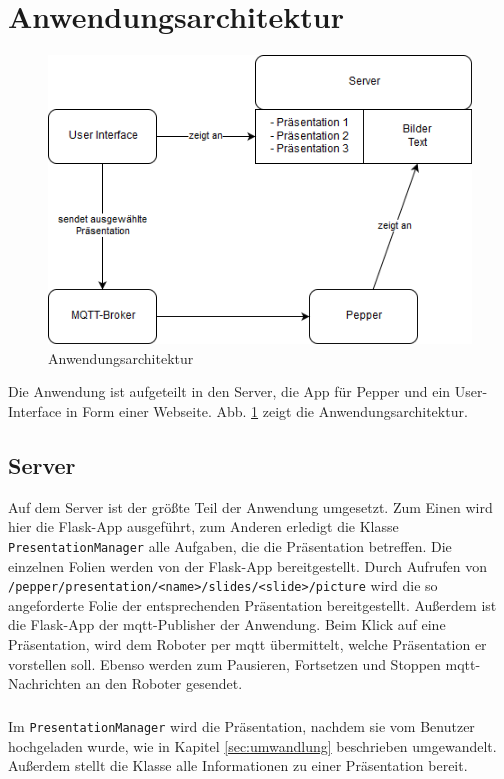 \section{Anwendungsarchitektur}
\begin{figure}
  \centering  
     \includegraphics[width=\textwidth]{anwendungsarchitektur}
  \caption{Anwendungsarchitektur}
  \label{fig:anwendungsarchitektur}
\end{figure}
Die Anwendung ist aufgeteilt in den Server, die App für Pepper und ein
User-Interface in Form einer Webseite. Abb. \ref{fig:anwendungsarchitektur}
zeigt die Anwendungsarchitektur.

\subsection{Server}
Auf dem Server ist der größte Teil der Anwendung umgesetzt. Zum Einen wird hier
die Flask-App ausgeführt, zum Anderen erledigt die Klasse
\texttt{PresentationManager} alle Aufgaben, die die Präsentation betreffen. Die
einzelnen Folien werden von der Flask-App bereitgestellt. Durch Aufrufen von
\texttt{/pepper/presentation/<name>/slides/<slide>/picture} wird die so
angeforderte Folie der entsprechenden Präsentation bereitgestellt. Außerdem ist
die Flask-App der \ac{mqtt}-Publisher der Anwendung. Beim Klick auf eine
Präsentation, wird dem Roboter per \ac{mqtt} übermittelt, welche Präsentation er
vorstellen soll. Ebenso werden zum Pausieren, Fortsetzen und Stoppen
\ac{mqtt}-Nachrichten an den Roboter gesendet.

\subparagraph{}
Im \texttt{PresentationManager} wird die Präsentation, nachdem sie vom Benutzer
hochgeladen wurde, wie in Kapitel \ref{sec:umwandlung} beschrieben umgewandelt.
Außerdem stellt die Klasse alle Informationen zu einer Präsentation bereit.

